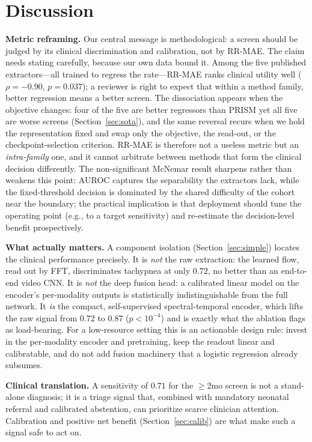 \documentclass[journal]{IEEEtran}
\begin{document}
\section{Discussion}\label{sec:disc}
\textbf{Metric reframing.} Our central message is methodological: a screen should be judged by its
clinical discrimination and calibration, not by RR-MAE. The claim needs stating carefully, because our
own data bound it. Among the five published extractors---all trained to regress the rate---RR-MAE ranks
clinical utility well ($\rho=-0.90$, $p=0.037$); a reviewer is right to expect that within a method
family, better regression means a better screen. The dissociation appears when the objective changes:
four of the five are better regressors than PRISM yet all five are worse screens
(Section~\ref{sec:sota}), and the same reversal recurs when we hold the representation fixed and swap
only the objective, the read-out, or the checkpoint-selection criterion. RR-MAE is therefore not a
useless metric but an \emph{intra-family} one, and it cannot arbitrate between methods that form the
clinical decision differently. The non-significant McNemar result sharpens rather than
weakens this point: AUROC captures the separability the extractors lack, while the fixed-threshold
decision is dominated by the shared difficulty of the cohort near the boundary; the practical implication
is that deployment should tune the operating point (e.g., to a target sensitivity) and re-estimate the
decision-level benefit prospectively.

\textbf{What actually matters.} A component isolation (Section~\ref{sec:simple}) locates the clinical
performance precisely. It is \emph{not} the raw extraction: the learned flow, read out by FFT, discriminates
tachypnea at only $0.72$, no better than an end-to-end video CNN. It is \emph{not} the deep fusion head: a
calibrated linear model on the encoder's per-modality outputs is statistically indistinguishable from the
full network. It \emph{is} the compact, self-supervised spectral-temporal encoder, which lifts the raw
signal from $0.72$ to $0.87$ ($p<10^{-4}$) and is exactly what the ablation flags as load-bearing. For a
low-resource setting this is an actionable design rule: invest in the per-modality encoder and pretraining,
keep the readout linear and calibratable, and do not add fusion machinery that a logistic regression
already subsumes.

\textbf{Clinical translation.} A sensitivity of $0.71$ for the $\ge$2mo screen is not a stand-alone
diagnosis; it is a triage signal that, combined with mandatory neonatal referral and calibrated
abstention, can prioritize scarce clinician attention. Calibration and positive net benefit
(Section~\ref{sec:calib}) are what make such a signal safe to act on.
\end{document}
